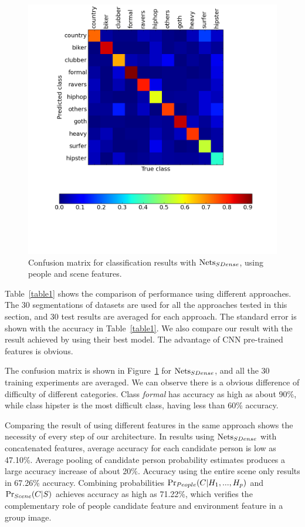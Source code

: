 \documentclass[10pt,twocolumn,letterpaper]{article}
\begin{document}
\begin{figure}[!t]
\begin{center}
\includegraphics[width=0.8\linewidth]{confusion.png}
\end{center}
\caption{Confusion matrix for classification results with  $\textup{Nets}_{SDense}$,  using people and scene features.}
\label{confusion}
\end{figure}


Table~\ref{table1} shows the comparison of performance using different approaches. The 30 segmentations of datasets are used for all the approaches tested in this section, and 30 test results are averaged for each approach. The standard error is shown with the accuracy in Table~\ref{table1}. We also compare our result with the result achieved by \cite{urbantribe2} using their best model. The advantage of CNN pre-trained features is obvious. 

The confusion matrix is shown in Figure~\ref{confusion} for $\textup{Nets}_{SDense}$, and all the 30 training experiments are averaged. We can observe there is a obvious difference of difficulty of different categories. Class \emph{formal} has accuracy as high as about 90\%, while class hipster is the most difficult class, having less than 60\% accuracy.

Comparing the result of using different features in the same approach shows the necessity of every step of our architecture. In results using  $\textup{Nets}_{SDense}$ with concatenated features, average accuracy for each candidate person  is low as 47.10\%. Average pooling of candidate person probability estimates produces a large accuracy increase of about 20\%. Accuracy using the entire scene only results in 67.26\% accuracy. Combining probabilities $\textup{Pr}_{People}(C|H_{1}, ..., H_{p})$ and $\textup{Pr}_{Scene}(C|S)$ achieves accuracy as high as 71.22\%, which verifies the complementary role of people candidate feature and environment feature in a group image. 
\end{document}
